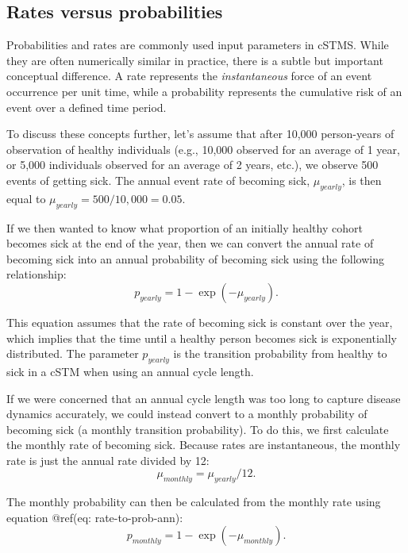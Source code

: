 \documentclass[
]{article}
\begin{document}
\hypertarget{rates-versus-probabilities}{%
\subsection{Rates versus probabilities}\label{rates-versus-probabilities}}

Probabilities and rates are commonly used input parameters in cSTMS. While they are often numerically similar in practice, there is a subtle but important conceptual difference. A rate represents the \textit{instantaneous} force of an event occurrence per unit time, while a probability represents the cumulative risk of an event over a defined time period.

To discuss these concepts further, let's assume that after 10,000 person-years of observation of healthy individuals (e.g., 10,000 observed for an average of 1 year, or 5,000 individuals observed for an average of 2 years, etc.), we observe 500 events of getting sick. The annual event rate of becoming sick, \(\mu_{yearly}\), is then equal to \(\mu_{yearly}=500 / 10,000=0.05\).

If we then wanted to know what proportion of an initially healthy cohort becomes sick at the end of the year, then we can convert the annual rate of becoming sick into an annual probability of becoming sick using the following relationship:
\begin{equation}
    p_{yearly} = 1-\exp{\left(-\mu_{yearly} \right)}.
    \label{eq:rate-to-prob-ann}
\end{equation}

This equation assumes that the rate of becoming sick is constant over the year, which implies that the time until a healthy person becomes sick is exponentially distributed. The parameter \(p_{yearly}\) is the transition probability from healthy to sick in a cSTM when using an annual cycle length.

If we were concerned that an annual cycle length was too long to capture disease dynamics accurately, we could instead convert to a monthly probability of becoming sick (a monthly transition probability). To do this, we first calculate the monthly rate of becoming sick. Because rates are instantaneous, the monthly rate is just the annual rate divided by 12:
\begin{equation}
    \mu_{monthly} = \mu_{yearly} / 12.
    \label{eq:rate-ann-to-month}
\end{equation}

The monthly probability can then be calculated from the monthly rate using equation @ref(eq: rate-to-prob-ann):
\begin{equation}
    p_{monthly} = 1-\exp{\left(-\mu_{monthly}\right)}.
    \label{eq:rate-to-prob-month}
\end{equation}
\end{document}
